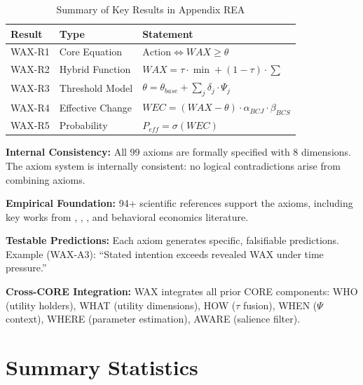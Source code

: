 \begin{table}[htbp]
\centering
\caption{Summary of Key Results in Appendix REA}
\label{tab:av-results}
\renewcommand{\arraystretch}{1.2}
\begin{tabular}{@{}llp{6cm}@{}}
\toprule
\textbf{Result} & \textbf{Type} & \textbf{Statement} \\
\midrule
WAX-R1 & Core Equation & $\text{Action} \Leftrightarrow WAX \geq \theta$ \\
WAX-R2 & Hybrid Function & $WAX = \tau \cdot \min + (1-\tau) \cdot \sum$ \\
WAX-R3 & Threshold Model & $\theta = \theta_{base} + \sum_j \delta_j \cdot \Psi_j$ \\
WAX-R4 & Effective Change & $WEC = (WAX - \theta) \cdot \alpha_{BCJ} \cdot \beta_{BCS}$ \\
WAX-R5 & Probability & $P_{eff} = \sigma(WEC)$ \\
\bottomrule
\end{tabular}
\end{table}

\begin{tcolorbox}[colback=green!5!white, colframe=green!75!black,
    title=\textbf{Validation Summary}]

\textbf{Internal Consistency:}
All 99 axioms are formally specified with 8 dimensions. The axiom system is
internally consistent: no logical contradictions arise from combining axioms.

\textbf{Empirical Foundation:}
94+ scientific references support the axioms, including key works from
\citet{kahneman2011}, \citet{tversky1992}, \citet{sheeran2016}, and behavioral
economics literature.

\textbf{Testable Predictions:}
Each axiom generates specific, falsifiable predictions. Example (WAX-A3):
``Stated intention exceeds revealed WAX under time pressure.''

\textbf{Cross-CORE Integration:}
WAX integrates all prior CORE components: WHO (utility holders), WHAT (utility dimensions),
HOW ($\tau$ fusion), WHEN ($\Psi$ context), WHERE (parameter estimation), AWARE (salience filter).

\end{tcolorbox}


\section{Summary Statistics}
\label{sec:av-summary}

